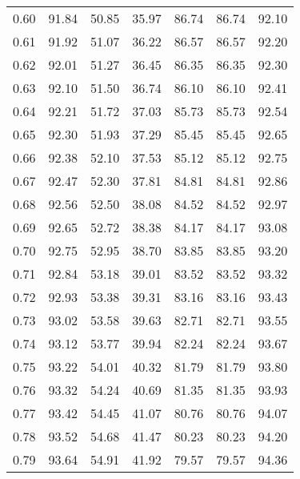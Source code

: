 \begin{tabular}{|c|c|c|c|c|c|c|}
      0.60 &     91.84 &     50.85 &      35.97 &   86.74 &      86.74 &         92.10 \\
      0.61 &     91.92 &     51.07 &      36.22 &   86.57 &      86.57 &         92.20 \\
      0.62 &     92.01 &     51.27 &      36.45 &   86.35 &      86.35 &         92.30 \\
      0.63 &     92.10 &     51.50 &      36.74 &   86.10 &      86.10 &         92.41 \\
      0.64 &     92.21 &     51.72 &      37.03 &   85.73 &      85.73 &         92.54 \\
      0.65 &     92.30 &     51.93 &      37.29 &   85.45 &      85.45 &         92.65 \\
      0.66 &     92.38 &     52.10 &      37.53 &   85.12 &      85.12 &         92.75 \\
      0.67 &     92.47 &     52.30 &      37.81 &   84.81 &      84.81 &         92.86 \\
      0.68 &     92.56 &     52.50 &      38.08 &   84.52 &      84.52 &         92.97 \\
      0.69 &     92.65 &     52.72 &      38.38 &   84.17 &      84.17 &         93.08 \\
      0.70 &     92.75 &     52.95 &      38.70 &   83.85 &      83.85 &         93.20 \\
      0.71 &     92.84 &     53.18 &      39.01 &   83.52 &      83.52 &         93.32 \\
      0.72 &     92.93 &     53.38 &      39.31 &   83.16 &      83.16 &         93.43 \\
      0.73 &     93.02 &     53.58 &      39.63 &   82.71 &      82.71 &         93.55 \\
      0.74 &     93.12 &     53.77 &      39.94 &   82.24 &      82.24 &         93.67 \\
      0.75 &     93.22 &     54.01 &      40.32 &   81.79 &      81.79 &         93.80 \\
      0.76 &     93.32 &     54.24 &      40.69 &   81.35 &      81.35 &         93.93 \\
      0.77 &     93.42 &     54.45 &      41.07 &   80.76 &      80.76 &         94.07 \\
      0.78 &     93.52 &     54.68 &      41.47 &   80.23 &      80.23 &         94.20 \\
      0.79 &     93.64 &     54.91 &      41.92 &   79.57 &      79.57 &         94.36 \\

\end{tabular}
